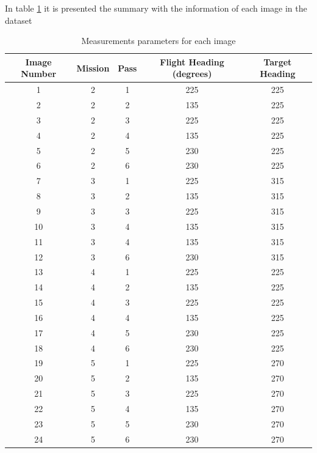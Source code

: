 In table \ref{tab:flight_mission} it is presented the summary with the information of each image in the dataset

\begin{table}[H]
    \centering
    \begin{tabular}{|c|c|c|c|c|}
        \hline
        Image Number & Mission & Pass & Flight Heading (degrees) & Target Heading \\ \hline
        1 & 2 & 1 & 225 & 225  \\ \hline
        2 & 2 & 2 & 135 & 225  \\ \hline
        3 & 2 & 3 & 225 & 225  \\ \hline
        4 & 2 & 4 & 135 & 225 \\ \hline
        5 & 2 & 5 & 230 & 225 \\ \hline
        6 & 2 & 6 & 230 & 225 \\ \hline
        7 & 3 & 1 & 225 & 315 \\ \hline
        8 & 3 & 2 & 135 & 315 \\ \hline
        9 & 3 & 3 & 225 & 315 \\ \hline
        10 & 3 & 4 & 135 & 315 \\ \hline
        11 & 3 & 4 & 135 & 315 \\ \hline
        12& 3 & 6 & 230 & 315  \\ \hline
        13 & 4 & 1 & 225 & 225  \\ \hline
        14 & 4 & 2 & 135 & 225  \\ \hline
        15 & 4 & 3 & 225 & 225  \\ \hline
        16 & 4 & 4 & 135 & 225  \\ \hline
        17 & 4 & 5 & 230 & 225  \\ \hline
        18 & 4 & 6 & 230& 225 \\ \hline
        19 & 5 & 1 & 225 & 270  \\ \hline
        20 & 5 & 2 & 135 & 270  \\ \hline
        21 & 5 & 3 & 225 & 270  \\ \hline
        22 & 5 & 4 & 135 & 270  \\ \hline
        23 & 5 & 5 & 230 & 270  \\ \hline
        24 & 5 & 6 & 230 & 270  \\ \hline
    \end{tabular}
    \caption{Measurements parameters for each image}
    \label{tab:flight_mission}
\end{table}

